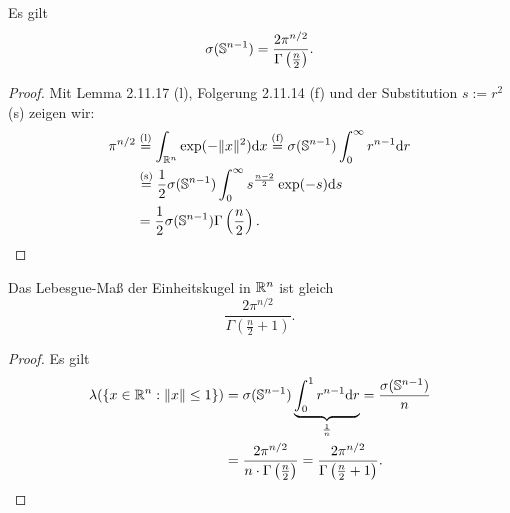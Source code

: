 \begin{lem}
  Es gilt
  \[ \sigma(\mathbb{S}^{n-1}) = \frac{2\pi^{n/2}}{\Gamma\left(  \frac{n}{2} \right)}. \]
\end{lem}

\begin{proof}
  Mit Lemma 2.11.17 (l), Folgerung 2.11.14 (f) und der Substitution  $s := r^2$
  (s) zeigen wir:
  \begin{align*}
    \pi^{n/2}
    &\overset{(\text{l})}{=} \int_{\mathbb{R}^n} \exp(-\|x\|^2) \mathrm{d} x
      \overset{(\text{f})}{=} \sigma(\mathbb{S}^{n-1}) \int_0^\infty r^{n-1} \mathrm{d} r \\
    &\overset{(\text{s})}{=} \frac{1}{2} \sigma( \mathbb{S}^{n-1}) \int_0^\infty s^{\frac{n-2}{2}}\exp(-s) \mathrm{d} s \\
    &= \frac{1}{2} \sigma( \mathbb{S}^{n-1}) \Gamma\left( \frac{n}{2} \right). \qedhere
  \end{align*}
\end{proof}

\begin{folg}
  Das Lebesgue-Maß der Einheitskugel in $\mathbb{R}^n$ ist gleich
  \[ \frac{2 \pi^{n/2}}{\Gamma\left(\frac{n}{2}+1\right)}.\]
\end{folg}

\begin{proof}
  Es gilt
  \begin{align*}
    \lambda(\{x \in \mathbb{R}^n : \| x \| \le 1 \} )
    &= \sigma(\mathbb{S}^{n-1}) \underbrace{\int_0^1 r^{n-1} \mathrm{d} r}_{\frac{1}{n}}
      = \frac{\sigma(\mathbb{S}^{n-1})}{n} \\
    &= \frac{2 \pi^{n/2}}{n \cdot \Gamma\left( \frac{n}{2} \right)}
      = \frac{2 \pi^{n/2}}{\Gamma\left( \frac{n}{2} + 1\right)}.
      \qedhere
  \end{align*}
\end{proof}

